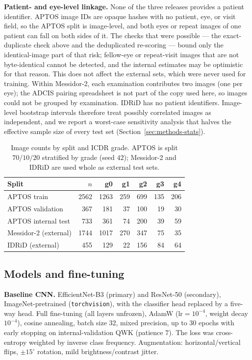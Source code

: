 \documentclass[journal]{IEEEtran}
\renewcommand{\_}{\origunderscore\allowbreak}
\begin{document}
\textbf{Patient- and eye-level linkage.} None of the three releases provides a
patient identifier. APTOS image IDs are opaque hashes with no patient, eye, or
visit field, so the APTOS split is image-level, and both eyes or repeat images
of one patient can fall on both sides of it. The checks that were possible ---
the exact-duplicate check above and the deduplicated re-scoring --- bound only
the identical-image part of that risk; fellow-eye or repeat-visit images that
are not byte-identical cannot be detected, and the internal estimates may be
optimistic for that reason. This does not affect the external sets, which were
never used for training. Within Messidor-2, each examination contributes two
images (one per eye); the ADCIS pairing spreadsheet is not part of the copy used
here, so images could not be grouped by examination. IDRiD has no patient
identifiers. Image-level bootstrap intervals therefore treat possibly
correlated images as independent, and we report a worst-case sensitivity
analysis that halves the effective sample size of every test set
(Section~\ref{sec:methods-stats}).

\begin{table}[!t]
\centering\small
\caption{Image counts by split and ICDR grade. APTOS is split
$70/10/20$ stratified by grade (seed $42$); Messidor-2 and IDRiD are used whole
as external test sets.}
\label{tab:counts}
\setlength{\tabcolsep}{4pt}
\begin{tabular}{lrrrrrr}
\toprule
Split & $n$ & g0 & g1 & g2 & g3 & g4 \\
\midrule
APTOS train & 2562 & 1263 & 259 & 699 & 135 & 206 \\
APTOS validation & 367 & 181 & 37 & 100 & 19 & 30 \\
APTOS internal test & 733 & 361 & 74 & 200 & 39 & 59 \\
\midrule
Messidor-2 (external) & 1744 & 1017 & 270 & 347 & 75 & 35 \\
IDRiD (external) & 455 & 129 & 22 & 156 & 84 & 64 \\
\bottomrule
\end{tabular}
\end{table}

\subsection{Models and fine-tuning}
\label{sec:methods-models}

\textbf{Baseline CNN.} EfficientNet-B3 \cite{tan2019efficientnet} (primary) and
ResNet-50 \cite{he2016resnet} (secondary), ImageNet-pretrained
(\texttt{torchvision}), with the classifier head replaced by a five-way head.
Full fine-tuning (all layers unfrozen), AdamW ($\text{lr}=10^{-4}$, weight decay
$10^{-4}$), cosine annealing, batch size $32$, mixed precision, up to $30$ epochs
with early stopping on internal-validation QWK (patience $7$). The loss was
cross-entropy weighted by inverse class frequency. Augmentation:
horizontal/vertical flips, $\pm15^{\circ}$ rotation, mild brightness/contrast
jitter.
\end{document}
